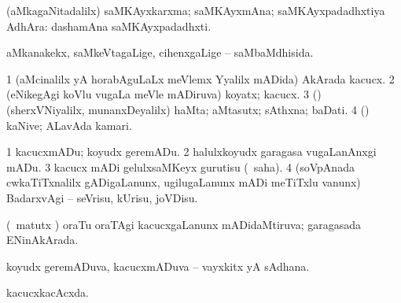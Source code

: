 \noindent
\gl{\pagu}
\bmng
{}(aMkagaNitadalilx) saMKAyxkarxma; saMKAyxmAna; saMKAyxpadadhxtiya AdhAra:  dashamAna saMKAyxpadadhxti. 
\emng
\eentry

\bentry
{}
\gl{\gu}
\bmng
aMkanakekx, saMkeVtagaLige, cihenxgaLige -- saMbaMdhisida. 
\emng
\eentry

\bentry
{}
\gl{\nA}
\bmng
\bnum
\num{1} (aMcinalilx yA horabAguLaLx meVlemx Yyalilx mADida) AkArada kacucx. 
\num{2} (eNikegAgi koVlu \mo vugaLa meVle mADiruva) koyatx; kacucx. 
\num{3} (\AmA) (sherxVNiyalilx, munanxDeyalilx) haMta; aMtasutx; sAthxna; baDati. 
\num{4} (\ame) kaNive; ALavAda kamari. 
\enum
\emng
\eentry

\bentry
{}
\gl{\sakirx}
\bmng
\bnum
\num{1} kacucxmADu; koyudx geremADu. 
\num{2} halulxkoyudx garagasa \mo vugaLanAnxgi mADu. 
\num{3} kacucx mADi gelulxsaMKeyx gurutisu (\rUpa\ saha). 
\num{4} (soVpAnada cwkaTiTxnalilx gADigaLanunx, ugilugaLanunx mADi meTiTxlu \mo vanunx) BadarxvAgi -- seVrisu, kUrisu, joVDisu. 
\enum
\emng
\eentry

\bentry
{}
\gl{\gu}
\bmng
(\savi\ matutx \pArxvi) oraTu oraTAgi kacucxgaLanunx mADidaMtiruva; garagasada ENinAkArada. 
\emng
\eentry

\bentry
{}
\gl{\nA}
\bmng
koyudx geremADuva, kacucxmADuva -- vayxkitx yA sAdhana. 
\emng
\eentry

\bentry
{}
\gl{\gu}
\bmng
kacucxkacAcxda. 
\emng
\eentry

